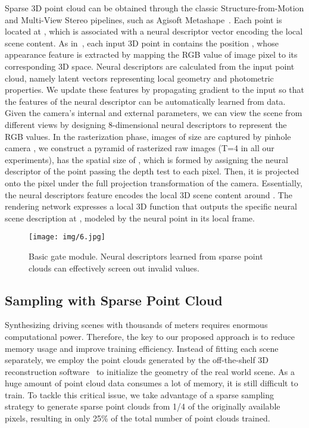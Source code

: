 \documentclass[sigconf]{acmart}
\begin{document}
Sparse 3D point cloud  can be obtained through the classic Structure-from-Motion and Multi-View Stereo pipelines, such as Agisoft Metashape~\cite{Metashape}. Each point  is located at , which is associated with a neural descriptor vector encoding the local scene content. As in~\cite{aliev2020neural}, each input 3D point in  contains the position , whose appearance feature is extracted by mapping the RGB value of image pixel to its corresponding 3D space. Neural descriptors  are calculated from the input point cloud, namely latent vectors representing local geometry and photometric properties. We update these features by propagating gradient to the input so that the features of the neural descriptor can be automatically learned from data. Given the camera's internal and external parameters, we can view the scene from different views by designing 8-dimensional neural descriptors to represent the RGB values. In the rasterization phase, images of size  are captured by pinhole camera , we construct a pyramid of rasterized raw images  (T=4 in all our experiments),  has the spatial size of , which is formed by assigning the neural descriptor of the point passing the depth test to each pixel. Then, it is projected onto the pixel under the full projection transformation of the camera. Essentially, the neural descriptors feature  encodes the local 3D scene content around . The rendering network expresses a local 3D function  that outputs the specific neural scene description  at , modeled by the neural point in its local frame.

 \begin{figure}[h]
  \centering
  \texttt{[image: img/6.jpg]}
  \caption{Basic gate module. Neural descriptors learned from sparse point clouds can effectively screen out invalid values.}
  \label{fig:label3}
\end{figure}


 
 

\subsection{Sampling with Sparse Point Cloud}
Synthesizing driving scenes with thousands of meters requires enormous computational power. Therefore, the key to our proposed approach is to reduce memory usage and improve training efficiency. Instead of fitting each scene separately, we employ the point clouds generated by the off-the-shelf 3D reconstruction software~\cite{Metashape} to initialize the geometry of the real world scene. As a huge amount of point cloud data consumes a lot of memory, it is still difficult to train. To tackle this critical issue, we take advantage of a sparse sampling strategy to generate sparse point clouds from 1/4 of the originally available pixels, resulting in only 25\% of the total number of point clouds trained.  
\end{document}
